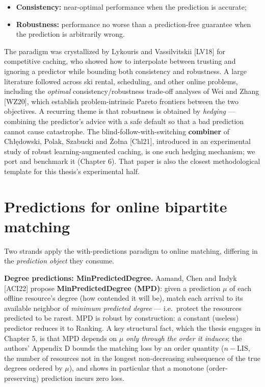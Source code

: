 \begin{itemize}
\tightlist
\item
  \textbf{Consistency:} near-optimal performance when the prediction is accurate;
\item
  \textbf{Robustness:} performance no worse than a prediction-free guarantee when the prediction
  is arbitrarily wrong.
\end{itemize}

The paradigm was crystallized by Lykouris and Vassilvitskii {[}LV18{]} for competitive caching,
who showed how to interpolate between trusting and ignoring a predictor while bounding both
consistency and robustness. A large literature followed across ski rental, scheduling,
and other online problems, including the \emph{optimal} consistency/robustness trade-off
analyses of Wei and Zhang {[}WZ20{]}, which establish problem-intrinsic Pareto frontiers
between the two objectives. A recurring theme is that robustness is obtained by \emph{hedging} ---
combining the predictor's advice with a safe default so that a bad prediction cannot cause
catastrophe. The blind-follow-with-switching \textbf{combiner} of Chłędowski, Polak, Szabucki
and Żołna {[}Chl21{]}, introduced in an experimental study of robust learning-augmented
caching, is one such hedging mechanism; we port and benchmark it (Chapter 6). That paper is
also the closest methodological template for this thesis's experimental half.

\section{Predictions for online bipartite matching}\label{predictions-for-online-bipartite-matching}

Two strands apply the with-predictions paradigm to online matching, differing in the
\emph{prediction object} they consume.

\textbf{Degree predictions: MinPredictedDegree.} Aamand, Chen and Indyk {[}ACI22{]} propose
\textbf{MinPredictedDegree (MPD)}: given a prediction \(\mu\) of each offline resource's degree
(how contended it will be), match each arrival to its available neighbor of \emph{minimum
predicted degree} --- i.e.~protect the resources predicted to be rarest. MPD is robust by
construction: a constant (useless) predictor reduces it to Ranking. A key structural fact,
which the thesis engages in Chapter 5, is that MPD depends on \(\mu\) \emph{only through the order
it induces}; the authors' Appendix D bounds the matching loss by an order quantity
(\(n-\mathrm{LIS}\), the number of resources not in the longest non-decreasing subsequence of
the true degrees ordered by \(\mu\)), and shows in particular that a monotone (order-preserving)
prediction incurs zero loss.

